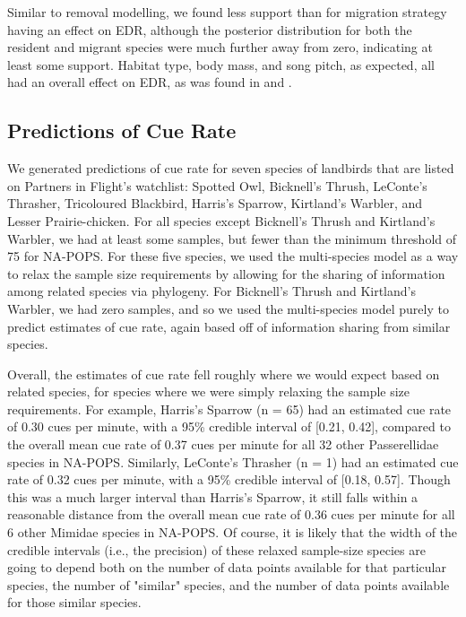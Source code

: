 \documentclass[12pt]{article}
\begin{document}
\par Similar to removal modelling, we found less support than \citet{solymos_phylogeny_2018} for migration strategy having an effect on EDR, although the posterior distribution for both the resident and migrant species were much further away from zero, indicating at least some support.
Habitat type, body mass, and song pitch, as expected, all had an overall effect on EDR, as was found in \citet{solymos_phylogeny_2018} and \cite{johnston_species_2014}.

\subsection{Predictions of Cue Rate}

\par We generated predictions of cue rate for seven species of landbirds that are listed on Partners in Flight's watchlist: Spotted Owl, Bicknell's Thrush, LeConte's Thrasher, Tricoloured Blackbird, Harris's Sparrow, Kirtland's Warbler, and Lesser Prairie-chicken. 
For all species except Bicknell's Thrush and Kirtland's Warbler, we had at least some samples, but fewer than the minimum threshold of 75 for NA-POPS.
For these five species, we used the multi-species model as a way to relax the sample size requirements by allowing for the sharing of information among related species via phylogeny.
For Bicknell's Thrush and Kirtland's Warbler, we had zero samples, and so we used the multi-species model purely to predict estimates of cue rate, again based off of information sharing from similar species.

\par Overall, the estimates of cue rate fell roughly where we would expect based on related species, for species where we were simply relaxing the sample size requirements.
For example, Harris's Sparrow (n = 65) had an estimated cue rate of 0.30 cues per minute, with a 95\% credible interval of [0.21, 0.42], compared to the overall mean cue rate of 0.37 cues per minute for all 32 other Passerellidae species in NA-POPS.
Similarly, LeConte's Thrasher (n = 1) had an estimated cue rate of 0.32 cues per minute, with a 95\% credible interval of [0.18, 0.57].
Though this was a much larger interval than Harris's Sparrow, it still falls within a reasonable distance from the overall mean cue rate of 0.36 cues per minute for all 6 other Mimidae species in NA-POPS.
Of course, it is likely that the width of the credible intervals (i.e., the precision) of these relaxed sample-size species are going to depend both on the number of data points available for that particular species, the number of "similar" species, and the number of data points available for those similar species.
\end{document}
